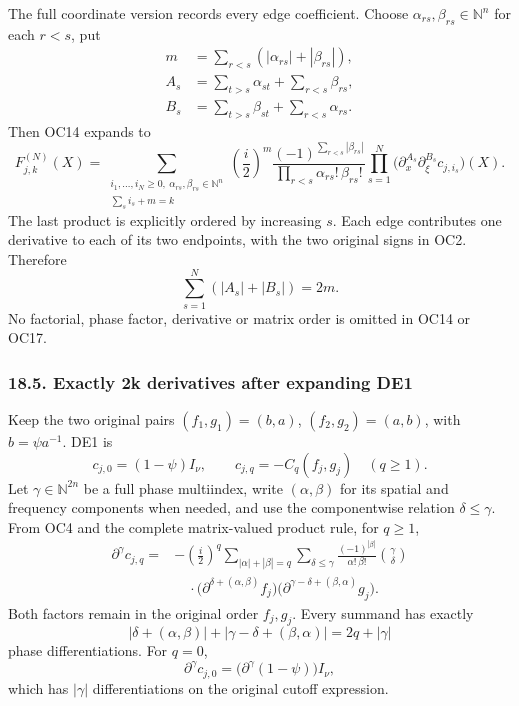 \documentclass[
  11pt,
]{article}
\begin{document}
The full coordinate version records every edge coefficient. Choose
\(\alpha_{rs},\beta_{rs}\in\mathbb N^n\) for each \(r<s\), put \[
\begin{aligned}
m&=\sum_{r<s}(|\alpha_{rs}|+|\beta_{rs}|),\\
A_s&=\sum_{t>s}\alpha_{st}+\sum_{r<s}\beta_{rs},\\
B_s&=\sum_{t>s}\beta_{st}+\sum_{r<s}\alpha_{rs}.
\end{aligned}
\tag{OC16}
\] Then OC14 expands to \[
F_{j,k}^{(N)}(X)
=\sum_{\substack{i_1,\ldots,i_N\ge0,\ \alpha_{rs},\beta_{rs}\in\mathbb N^n\\
                 \sum_s i_s+m=k}}
 \left(\frac i2\right)^m
 \frac{(-1)^{\sum_{r<s}|\beta_{rs}|}}
      {\prod_{r<s}\alpha_{rs}!\,\beta_{rs}!}
 \prod_{s=1}^{N}
   \bigl(\partial_x^{A_s}\partial_\xi^{B_s}c_{j,i_s}\bigr)(X).
\tag{OC17}
\] The last product is explicitly ordered by increasing \(s\). Each edge
contributes one derivative to each of its two endpoints, with the two
original signs in OC2. Therefore \[
\sum_{s=1}^N(|A_s|+|B_s|)=2m.
\tag{OC18}
\] No factorial, phase factor, derivative or matrix order is omitted in
OC14 or OC17.

\subsubsection{18.5. Exactly 2k derivatives after expanding
DE1}\label{exactly-2k-derivatives-after-expanding-de1}

Keep the two original pairs \((f_1,g_1)=(b,a)\), \((f_2,g_2)=(a,b)\),
with \(b=\psi a^{-1}\). DE1 is \[
c_{j,0}=(1-\psi)I_\nu,
\qquad c_{j,q}=-C_q(f_j,g_j)\quad(q\ge1).
\tag{OC19}
\] Let \(\gamma\in\mathbb N^{2n}\) be a full phase multiindex, write
\((\alpha,\beta)\) for its spatial and frequency components when needed,
and use the componentwise relation \(\delta\le\gamma\). From OC4 and the
complete matrix-valued product rule, for \(q\ge1\), \[
\begin{aligned}
\partial^\gamma c_{j,q}
={}&-\left(\frac i2\right)^q
\sum_{|\alpha|+|\beta|=q}
\sum_{\delta\le\gamma}
 \frac{(-1)^{|\beta|}}{\alpha!\,\beta!}
 \binom\gamma\delta\\
&\quad\cdot
 \bigl(\partial^{\delta+(\alpha,\beta)}f_j\bigr)
 \bigl(\partial^{\gamma-\delta+(\beta,\alpha)}g_j\bigr).
\end{aligned}
\tag{OC20}
\] Both factors remain in the original order \(f_j,g_j\). Every summand
has exactly \[
|\delta+(\alpha,\beta)|
 +|\gamma-\delta+(\beta,\alpha)|
=2q+|\gamma|
\tag{OC21}
\] phase differentiations. For \(q=0\), \[
\partial^\gamma c_{j,0}
=\bigl(\partial^\gamma(1-\psi)\bigr)I_\nu,
\tag{OC22}
\] which has \(|\gamma|\) differentiations on the original cutoff
expression.
\end{document}
